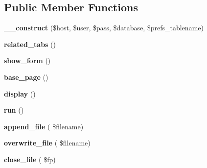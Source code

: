 \subsection*{Public Member Functions}
\begin{DoxyCompactItemize}
\item 
\hypertarget{classgeneric__interface_a1776ffb8e07b10eebcc6b71c7a057ea9}{}\label{classgeneric__interface_a1776ffb8e07b10eebcc6b71c7a057ea9} 
{\bfseries \+\_\+\+\_\+construct} (\$host, \$user, \$pass, \$database, \$prefs\+\_\+tablename)
\item 
\hypertarget{classgeneric__interface_af90523f08023ce9450f373f5c9dbf10e}{}\label{classgeneric__interface_af90523f08023ce9450f373f5c9dbf10e} 
{\bfseries related\+\_\+tabs} ()
\item 
\hypertarget{classgeneric__interface_a56cb641385fbc70dbb4496fcc87e6487}{}\label{classgeneric__interface_a56cb641385fbc70dbb4496fcc87e6487} 
{\bfseries show\+\_\+form} ()
\item 
\hypertarget{classgeneric__interface_ae447e539a3b57457ab7053131114dc72}{}\label{classgeneric__interface_ae447e539a3b57457ab7053131114dc72} 
{\bfseries base\+\_\+page} ()
\item 
\hypertarget{classgeneric__interface_afee00299dfab91da297364712a556128}{}\label{classgeneric__interface_afee00299dfab91da297364712a556128} 
{\bfseries display} ()
\item 
\hypertarget{classgeneric__interface_a2eda996cce2eb81ba95b3c13499f2a29}{}\label{classgeneric__interface_a2eda996cce2eb81ba95b3c13499f2a29} 
{\bfseries run} ()
\item 
\hypertarget{classgeneric__interface_ab12f6446b4f5986859cf5c3596d66e2f}{}\label{classgeneric__interface_ab12f6446b4f5986859cf5c3596d66e2f} 
{\bfseries append\+\_\+file} ( \$filename)
\item 
\hypertarget{classgeneric__interface_afa46d3c4fda07165bbf46c5b43177f01}{}\label{classgeneric__interface_afa46d3c4fda07165bbf46c5b43177f01} 
{\bfseries overwrite\+\_\+file} ( \$filename)
\item 
\hypertarget{classgeneric__interface_a2816e5f9355bb2051a08b36f5fe37b90}{}\label{classgeneric__interface_a2816e5f9355bb2051a08b36f5fe37b90} 
{\bfseries close\+\_\+file} ( \$fp)
\end{DoxyCompactItemize}
